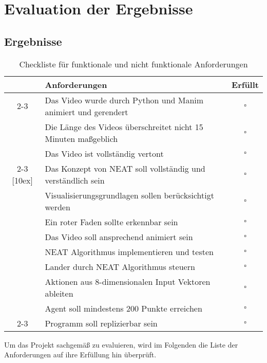\chapter{Evaluation der Ergebnisse}
\label{chapter:4}
\section{Ergebnisse}
\begin{table}[h]
	\centering
	\begin{tabularx}{\textwidth}{|c|X|c|}
		\hline
		\multirow{34}{*}[4ex]{\rotatebox[origin=c]{90}{\centering \textbf{Visualisierung}}} & \textbf{Anforderungen} & \textbf{Erfüllt} \\
		\cline{2-3}
		& Das Video wurde durch Python und Manim animiert und gerendert & $\square$ \\[4ex]
		& Die Länge des Videos überschreitet nicht 15 Minuten maßgeblich & $\square$ \\[4ex]
		& Das Video ist vollständig vertont & $\square$ \\[4ex]
		\cline{2-3}
		\multirow{44}{*}[10ex]{\rotatebox[origin=c]{90}{\centering \textbf{Implementierung}}} & Das Konzept von NEAT soll vollständig und verständlich sein & $\square$ \\[4ex]
		& Visualisierungsgrundlagen sollen berücksichtigt werden & $\square$ \\[4ex]
		& Ein roter Faden sollte erkennbar sein & $\square$ \\[4ex]
		& Das Video soll ansprechend animiert sein & $\square$ \\[4ex]
		\hline
		& NEAT Algorithmus implementieren und testen & $\square$ \\[4ex]
		& Lander durch NEAT Algorithmus steuern & $\square$ \\[4ex]
		& Aktionen aus 8-dimensionalen Input Vektoren ableiten & $\square$ \\[4ex]
		& Agent soll mindestens 200  Punkte erreichen & $\square$ \\[4ex]
		\cline{2-3}
		& Programm soll replizierbar sein & $\square$ \\[4ex]
		\hline
	\end{tabularx}
	\caption{Checkliste für funktionale und nicht funktionale Anforderungen}
\end{table}

Um das Projekt sachgemäß zu evaluieren, wird im Folgenden die Liste der Anforderungen auf ihre Erfüllung hin überprüft.

